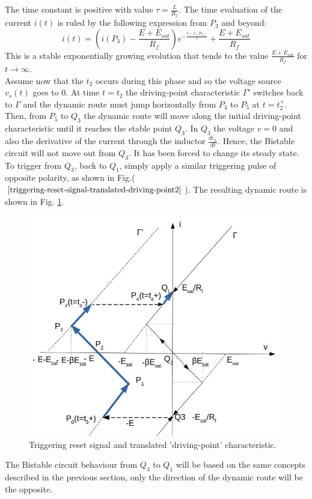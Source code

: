 \documentclass[12pt,a4paper,tweside,onehalfspacing]{article}
\begin{document}
\noindent The time constant is positive with value $\tau=\frac{L}{R_f}$.
The time evaluation of the current $i(t)$ is ruled by the following expression from $P_3$ and beyond:
\begin{equation}
    i(t)=\left(i(P_3) -\frac{E+E_{sat}}{R_f}\right)e^{-\frac{t-t(P_3)}{\tau}}+\frac{E+E_{sat}}{R_f}
\end{equation}
This is a stable exponentially growing evolution that tends to the value $\frac{E+E_{sat}}{R_f}$ for $t\rightarrow\infty$.\\
Assume now that the $t_2$ occurs during this phase and so the voltage source $v_s(t)$ goes to $0$. At time $t=t_2$ the driving-point characteristic $\Gamma'$ switches back to $\Gamma$ and the dynamic route must jump horizontally from $P_4$ to $P_5$ at $t=t_2^{+}$. Then, from $P_5$ to $Q_3$ the dynamic route will move along the initial driving-point characteristic until it reaches the stable point $Q_3$. In $Q_3$ the voltage $v=0$ and also the derivative of the current through the inductor $\frac{di_L}{dt}$. Hence, the Bistable circuit will not move out from $Q_3$. It has been forced to change its steady state.\\
%
To trigger from $Q_3$, back to $Q_1$, simply apply a similar triggering pulse of opposite polarity, as shown in Fig.($\ref{triggering-reset-signal-translated-driving-point2}$). The resulting dynamic route is shown in Fig. \ref{triggering-reset-signal-translated-driving-point2}.
%
\begin{figure}[!ht]
        \centering \includegraphics[width=0.9\columnwidth]{driving-point-characteristic-back-shifted.jpg}
        \caption{\label{triggering-reset-signal-translated-driving-point2}Triggering reset signal and translated 'driving-point' characteristic.
        }
\end{figure}
%
The Bistable circuit behaviour from $Q_3$ to $Q_1$ will be based on the same concepts described in the previous section, only the direction of the dynamic route will be the opposite.
%
\end{document}
